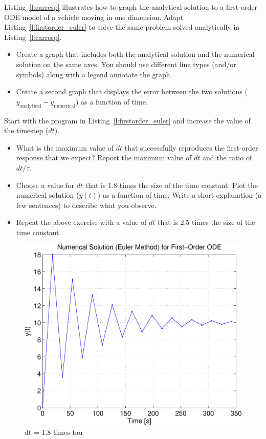\begin{ex}
Listing~\ref{l:carresp} illustrates how to graph the analytical solution to a first-order ODE model of a vehicle moving in one dimension.  Adapt Listing~\ref{l:firstorder_euler} to solve the same problem solved analytically in Listing~\ref{l:carresp}. 
\begin{itemize}
\item Create a graph that includes both the analytical solution and the numerical solution on the same axes.  You should use different line types (and/or symbols) along with a legend annotate the graph.
\item Create a second graph that displays the error between the two solutions ($y_{\mathrm{analytical}} - y_{\mathrm{numerical}}$) as a function of time.
\end{itemize}
\end{ex}

\begin{ex}
Start with the program in Listing~\ref{l:firstorder_euler} and increase the value of the timestep ($dt$).  
\begin{itemize}
\item What is the maximum value of $dt$ that successfully reproduces the first-order response that we expect?  Report the maximum value of $dt$ and the ratio of $dt/\tau$.  
\item Choose a value for $dt$ that is 1.8 times the size of the time constant.  Plot the numerical solution ($y(t)$) as a function of time.  Write a short explanation (a few sentences) to describe what you observe.
\item Repeat the above exercise with a value of $dt$ that is 2.5 times the size of the time constant.
\end{itemize}
\end{ex}

\ifsolutions


\begin{figure}[hbt]
\centering
\includegraphics[width=\FigWidth\textwidth]{../code/firstorder_euler_soln.png}
\caption{dt = 1.8 times tau}
\label{f:euler_soln1}
\end{figure}

